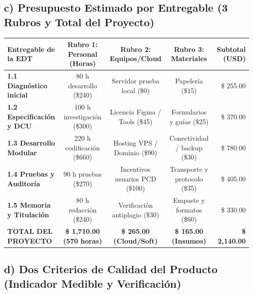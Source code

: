 \documentclass[10pt,a4paper]{article}
\begin{document}
\newpage

\subsection*{\normalsize\color{utiNavy}c) Presupuesto Estimado por Entregable (3 Rubros y Total del Proyecto)}

\begin{center}
\footnotesize
\renewcommand{\arraystretch}{1.1}
\begin{tabularx}{\textwidth}{X c c c r}
\toprule
\textbf{Entregable de la EDT} & \textbf{Rubro 1: Personal (Horas)} & \textbf{Rubro 2: Equipos/Cloud} & \textbf{Rubro 3: Materiales} & \textbf{Subtotal (USD)} \\
\midrule
\textbf{1.1 Diagnóstico inicial} & 80 h desarrollo (\$240) & Servidor prueba local (\$0) & Papelería (\$15) & \$ 255.00 \\
\textbf{1.2 Especificación y DCU} & 100 h investigación (\$300) & Licencia Figma / Tools (\$45) & Formularios y guías (\$25) & \$ 370.00 \\
\textbf{1.3 Desarrollo Modular} & 220 h codificación (\$660) & Hosting VPS / Dominio (\$90) & Conectividad / backup (\$30) & \$ 780.00 \\
\textbf{1.4 Pruebas y Auditoría} & 90 h pruebas (\$270) & Incentivos usuarios PCD (\$100) & Transporte y protocolo (\$35) & \$ 405.00 \\
\textbf{1.5 Memoria y Titulación} & 80 h redacción (\$240) & Verificación antiplagio (\$30) & Empaste y formatos (\$60) & \$ 330.00 \\
\midrule
\textbf{TOTAL DEL PROYECTO} & \textbf{\$ 1,710.00 (570 horas)} & \textbf{\$ 265.00 (Cloud/Soft)} & \textbf{\$ 165.00 (Insumos)} & \textbf{\$ 2,140.00} \\
\bottomrule
\end{tabularx}
\end{center}

\subsection*{\normalsize\color{utiNavy}d) Dos Criterios de Calidad del Producto (Indicador Medible y Verificación)}
\end{document}
